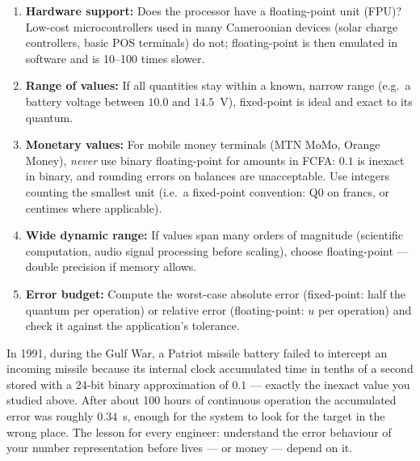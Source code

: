 \documentclass[11pt]{article}
\begin{document}
\begin{methode}
\begin{enumerate}
\item \textbf{Hardware support:} Does the processor have a floating-point unit (FPU)? Low-cost microcontrollers used in many Cameroonian devices (solar charge controllers, basic POS terminals) do not; floating-point is then emulated in software and is 10--100 times slower.
\item \textbf{Range of values:} If all quantities stay within a known, narrow range (e.g.\ a battery voltage between $10.0$ and $14.5$~V), fixed-point is ideal and exact to its quantum.
\item \textbf{Monetary values:} For mobile money terminals (MTN MoMo, Orange Money), \emph{never} use binary floating-point for amounts in FCFA: $0.1$ is inexact in binary, and rounding errors on balances are unacceptable. Use integers counting the smallest unit (i.e.\ a fixed-point convention: Q0 on francs, or centimes where applicable).
\item \textbf{Wide dynamic range:} If values span many orders of magnitude (scientific computation, audio signal processing before scaling), choose floating-point — double precision if memory allows.
\item \textbf{Error budget:} Compute the worst-case absolute error (fixed-point: half the quantum per operation) or relative error (floating-point: $u$ per operation) and check it against the application's tolerance.
\end{enumerate}
\end{methode}

\begin{savaistu}
In 1991, during the Gulf War, a Patriot missile battery failed to intercept an incoming missile because its internal clock accumulated time in tenths of a second stored with a 24-bit binary approximation of $0.1$ — exactly the inexact value you studied above. After about 100 hours of continuous operation the accumulated error was roughly $0.34$~s, enough for the system to look for the target in the wrong place. The lesson for every engineer: understand the error behaviour of your number representation before lives — or money — depend on it.
\end{savaistu}
\end{document}
